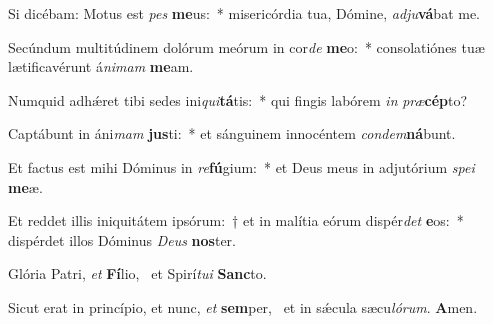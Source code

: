 \item Si dicébam: Motus est \textit{pes} \textbf{me}us:~* misericórdia tua, Dómine, \textit{ad}\textit{ju}\textbf{vá}bat me.
\item Secúndum multitúdinem dolórum meórum in cor\textit{de} \textbf{me}o:~* consolatiónes tuæ lætificavérunt á\textit{ni}\textit{mam} \textbf{me}am.
\item Numquid adhǽret tibi sedes ini\textit{qui}\textbf{tá}tis:~* qui fingis labórem \textit{in} \textit{præ}\textbf{cép}to?
\item Captábunt in áni\textit{mam} \textbf{jus}ti:~* et sánguinem innocéntem \textit{con}\textit{dem}\textbf{ná}bunt.
\item Et factus est mihi Dóminus in \textit{re}\textbf{fú}gium:~* et Deus meus in adjutórium \textit{spe}\textit{i} \textbf{me}æ.
\item Et reddet illis iniquitátem ipsórum:~† et in malítia eórum dispér\textit{det} \textbf{e}os:~* dispérdet illos Dóminus \textit{De}\textit{us} \textbf{nos}ter.
\item Glória Patri, \textit{et} \textbf{Fí}lio,~\psstar{} et Spirí\textit{tu}\textit{i} \textbf{Sanc}to.
\item Sicut erat in princípio, et nunc, \textit{et} \textbf{sem}per,~\psstar{} et in sǽcula sæcu\textit{ló}\textit{rum}. \textbf{A}men.